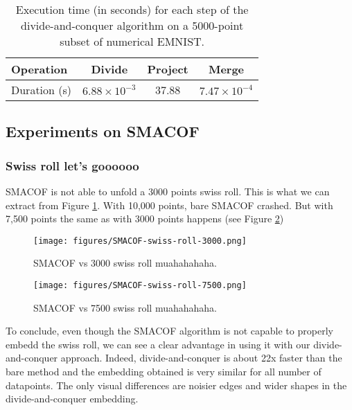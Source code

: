 \begin{table}[ht]
    \centering
    \begin{tabular}{lccc}
        \toprule
        Operation    & Divide & Project & Merge \\
        \midrule
        Duration (s) & $6.88 \times 10^{-3}$ & 37.88 & $7.47 \times 10^{-4}$ \\
        \bottomrule
    \end{tabular}
    \caption{Execution time (in seconds) for each step of the divide-and-conquer algorithm on a 5000-point subset of numerical EMNIST.}
    \label{tab:dc-overhead}
\end{table}

\subsection{Experiments on SMACOF}

\subsubsection{Swiss roll let's goooooo}

SMACOF is not able to unfold a 3000 points swiss roll. This is what we can extract from Figure \ref{fig:SMACOF-swiss-roll-3000}. With 10,000 points, bare SMACOF crashed. But with 7,500 points the same as with 3000 points happens (see Figure \ref{fig:SMACOF-swiss-roll-7500})

\begin{figure}[ht]
    \centering
    \texttt{[image: figures/SMACOF-swiss-roll-3000.png]}
    \caption{SMACOF vs 3000 swiss roll muahahahaha.}
    \label{fig:SMACOF-swiss-roll-3000}
\end{figure}

\begin{figure}[ht]
    \centering
    \texttt{[image: figures/SMACOF-swiss-roll-7500.png]}
    \caption{SMACOF vs 7500 swiss roll muahahahaha.}
    \label{fig:SMACOF-swiss-roll-7500}
\end{figure}

To conclude, even though the SMACOF algorithm is not capable to properly embedd the swiss roll, we can see a clear advantage in using it with our divide-and-conquer approach. Indeed, divide-and-conquer is about 22x faster than the bare method and the embedding obtained is very similar for all number of datapoints. The only visual differences are noisier edges and wider shapes in the divide-and-conquer embedding.

